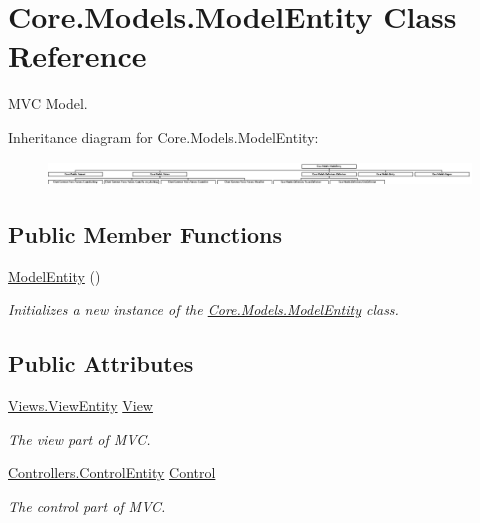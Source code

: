 \hypertarget{classCore_1_1Models_1_1ModelEntity}{}\section{Core.\+Models.\+Model\+Entity Class Reference}
\label{classCore_1_1Models_1_1ModelEntity}


M\+V\+C Model.  


Inheritance diagram for Core.\+Models.\+Model\+Entity\+:\begin{figure}[H]
\begin{center}
\leavevmode
\includegraphics[height=0.648148cm]{classCore_1_1Models_1_1ModelEntity}
\end{center}
\end{figure}
\subsection*{Public Member Functions}
\begin{DoxyCompactItemize}
\item 
\hyperlink{classCore_1_1Models_1_1ModelEntity_a7b738ffece3d63b0a7e22697cd2a15ef}{Model\+Entity} ()
\begin{DoxyCompactList}\small\item\em Initializes a new instance of the \hyperlink{classCore_1_1Models_1_1ModelEntity}{Core.\+Models.\+Model\+Entity} class. \end{DoxyCompactList}\end{DoxyCompactItemize}
\subsection*{Public Attributes}
\begin{DoxyCompactItemize}
\item 
\hyperlink{classCore_1_1Views_1_1ViewEntity}{Views.\+View\+Entity} \hyperlink{classCore_1_1Models_1_1ModelEntity_a19619acbb856f7b54c971b38f061509c}{View}
\begin{DoxyCompactList}\small\item\em The view part of M\+V\+C. \end{DoxyCompactList}\item 
\hyperlink{classCore_1_1Controllers_1_1ControlEntity}{Controllers.\+Control\+Entity} \hyperlink{classCore_1_1Models_1_1ModelEntity_a78a6ddcf09a0b517230e738c40faa813}{Control}
\begin{DoxyCompactList}\small\item\em The control part of M\+V\+C. \end{DoxyCompactList}\end{DoxyCompactItemize}


